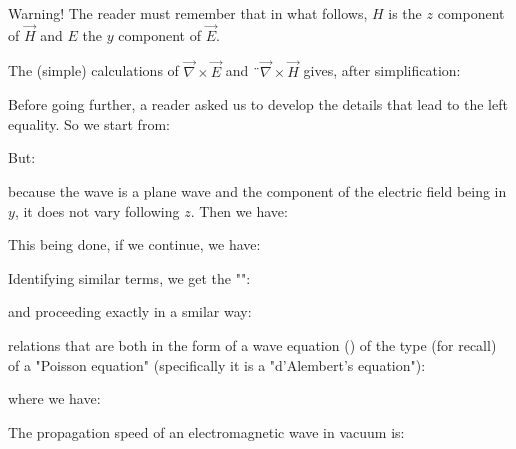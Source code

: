 	\begin{tcolorbox}[title=Remark,colframe=black,arc=10pt]
	Warning! The reader must remember that in what follows, $H$ is the $z$ component of $\vec{H}$ and $E$ the $y$ component of $\vec{E}$.
	\end{tcolorbox}
	The (simple) calculations of $\vec{\nabla}\times\vec{E}$ and $¨\vec{\nabla}\times\vec{H}$ gives, after simplification:
	
	Before going further, a reader asked us to develop the details that lead to the left equality. So we start from:
	
	But:
	
	because the wave is a plane wave and the component of the electric field being in $y$, it does not vary following $z$. Then we have:
	
	This being done, if we continue, we have:
	
	Identifying similar terms, we get the "":
	
	and proceeding exactly in a smilar way:
	
	relations that are both in the form of a wave equation () of the type (for recall) of a "Poisson equation" (specifically it is a "d'Alembert's equation"):
	
	where we have:
	
	The propagation speed of an electromagnetic wave in vacuum is:
	
